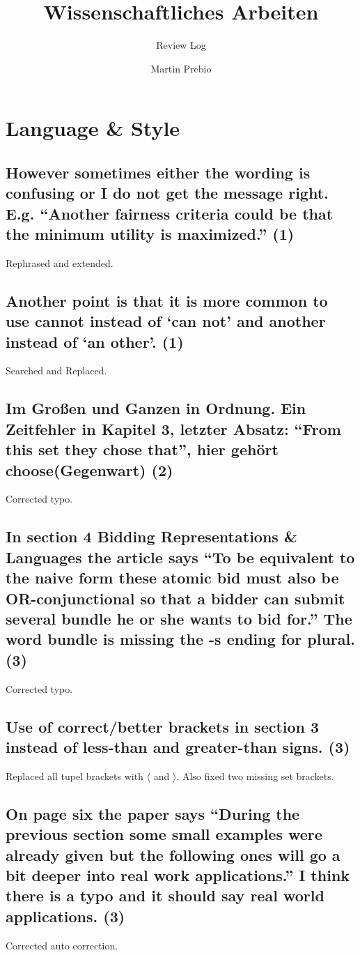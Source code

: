 \documentclass{"../../Datenanalyse/assignments/latex-brookesassignment/brookes-assignment"}
\author{Martin Prebio}
\title{Wissenschaftliches Arbeiten}
\subtitle{Review Log}
\begin{document}
\maketitle


\section{Language \& Style}
\subsection{However sometimes either the wording is confusing or I do not get the message right. E.g. ``Another fairness criteria could be that the minimum utility is maximized.'' (1)}
Rephrased and extended.
\subsection{Another point is that it is more common to use cannot instead of `can not' and another instead of `an other'. (1)}
Searched and Replaced.
\subsection{Im Großen und Ganzen in Ordnung. Ein Zeitfehler in Kapitel 3, letzter Absatz: ``From this set they chose that'', hier gehört choose(Gegenwart) (2)}
Corrected typo.
\subsection{In section 4 Bidding Representations \& Languages the article says ``To be equivalent to the naive form these atomic bid must also be OR-conjunctional so that a bidder can submit several bundle he or she wants to bid for.'' The word bundle is missing the -s ending for plural. (3)}
Corrected typo.
\subsection{Use of correct/better brackets in section 3 instead of less-than and greater-than signs. (3)}
Replaced all tupel brackets with $\langle$ and $\rangle$. Also fixed two missing set brackets.
\subsection{On page six the paper says ``During the previous section some small examples were already given but the following ones will go a bit deeper into real work applications.'' I think there is a typo and it should say real world applications. (3)}
Corrected auto correction.
\end{document}
